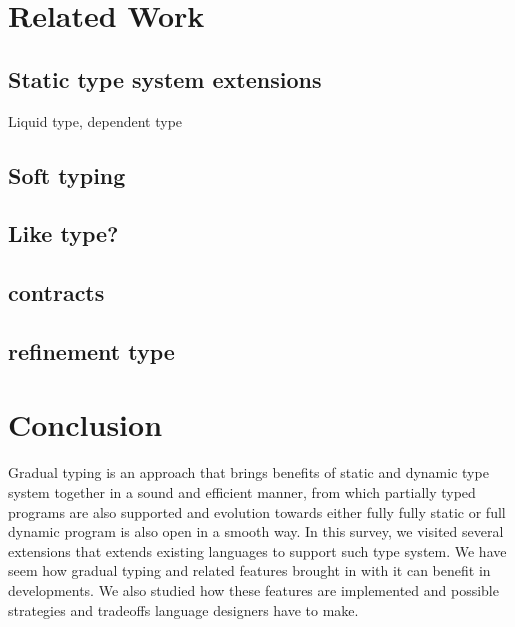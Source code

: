 \section{Related Work}

\subsection{Static type system extensions}

Liquid type, dependent type

\subsection{Soft typing}

\subsection{Like type?}

\subsection{contracts}

\subsection{refinement type}




\renewcommand{\thechapter}{5}
\section{Conclusion}

Gradual typing is an approach that brings benefits of static and dynamic type system
together in a sound and efficient manner, from which partially typed programs are also supported
and evolution towards either fully fully static or full dynamic program is also open in a smooth way.
In this survey, we visited several extensions that extends existing languages to support such type system.
We have seem how gradual typing and related features brought in with it can benefit in developments.
We also studied how these features are implemented and possible strategies and tradeoffs language designers have
to make.




